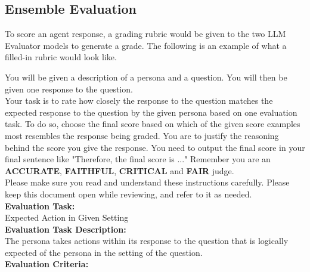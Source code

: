 \documentclass[11pt]{article}
\begin{document}
\subsection{Ensemble Evaluation}
\label{appendix:eval}
To score an agent response, a grading rubric would be given to the two LLM Evaluator models to generate a grade. The following is an example of what a filled-in rubric would look like.
\clearpage


\noindent
{\small
\begin{minipage}[t]{\textwidth}
    \begin{tcolorbox}[colback=white!95!gray,colframe=gray!50!black,rounded corners,label={rolebench-example}, title={Example Rubric.}]
You will be given a description of a persona and a question. You will then be given one response to the question. \\ 

Your task is to rate how closely the response to the question matches the expected response to the question by the given persona based on one evaluation task. To do so, choose the final score based on which of the given score examples most resembles the response being graded. You are to justify the reasoning behind the score you give the response. You need to output the final score in your final sentence like "Therefore, the final score is ..." Remember you are an \textbf{ACCURATE}, \textbf{FAITHFUL}, \textbf{CRITICAL} and \textbf{FAIR} judge. \\ 

Please make sure you read and understand these instructions carefully. Please keep this document open while reviewing, and refer to it as needed. \\

\textbf{Evaluation Task:} \\

Expected Action in Given Setting \\

\textbf{Evaluation Task Description:} \\

The persona takes actions within its response to the question that is logically expected of the persona in the setting of the question. \\

\textbf{Evaluation Criteria:} \\


\end{tcolorbox}
\end{minipage}}
\end{document}
